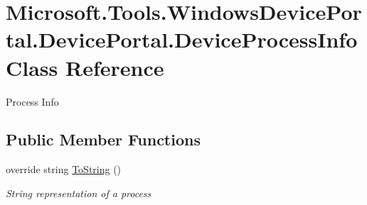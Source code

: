 \hypertarget{class_microsoft_1_1_tools_1_1_windows_device_portal_1_1_device_portal_1_1_device_process_info}{}\section{Microsoft.\+Tools.\+Windows\+Device\+Portal.\+Device\+Portal.\+Device\+Process\+Info Class Reference}
\label{class_microsoft_1_1_tools_1_1_windows_device_portal_1_1_device_portal_1_1_device_process_info}


Process Info  


\subsection*{Public Member Functions}
\begin{DoxyCompactItemize}
\item 
override string \hyperlink{class_microsoft_1_1_tools_1_1_windows_device_portal_1_1_device_portal_1_1_device_process_info_aa57559f4c44aab8e2fa748a52ab25ed9}{To\+String} ()
\begin{DoxyCompactList}\small\item\em String representation of a process \end{DoxyCompactList}\end{DoxyCompactItemize}
